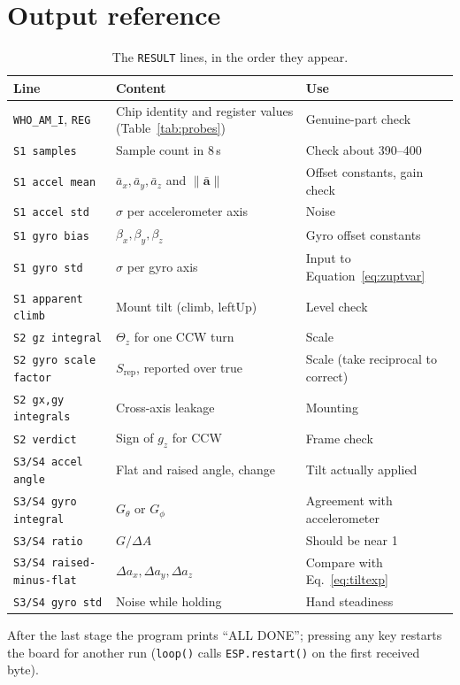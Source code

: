 \documentclass[11pt,a4paper]{report}
\newcommand{\code}[1]{\texttt{#1}}
\begin{document}
\section{Output reference}
\begin{table}[H]
\centering
\caption{The \code{RESULT} lines, in the order they appear.}\label{tab:resultlines}
\small
\begin{tabular}{@{}p{3.4cm}p{6.2cm}p{4.2cm}@{}}
\toprule
Line & Content & Use\\
\midrule
\code{WHO\_AM\_I}, \code{REG} & Chip identity and register values (Table~\ref{tab:probes}) & Genuine-part check\\
\code{S1 samples} & Sample count in 8\,s & Check about 390--400\\
\code{S1 accel mean} & $\bar a_x,\bar a_y,\bar a_z$ and $\lVert\bar{\mathbf a}\rVert$ & Offset constants, gain check\\
\code{S1 accel std} & $\sigma$ per accelerometer axis & Noise\\
\code{S1 gyro bias} & $\beta_x,\beta_y,\beta_z$ & Gyro offset constants\\
\code{S1 gyro std} & $\sigma$ per gyro axis & Input to Equation~\eqref{eq:zuptvar}\\
\code{S1 apparent climb} & Mount tilt (climb, leftUp) & Level check\\
\code{S2 gz integral} & $\Theta_z$ for one CCW turn & Scale\\
\code{S2 gyro scale factor} & $S_{\mathrm{rep}}$, reported over true & Scale (take reciprocal to correct)\\
\code{S2 gx,gy integrals} & Cross-axis leakage & Mounting\\
\code{S2 verdict} & Sign of $g_z$ for CCW & Frame check\\
\code{S3/S4 accel angle} & Flat and raised angle, change & Tilt actually applied\\
\code{S3/S4 gyro integral} & $G_\theta$ or $G_\phi$ & Agreement with accelerometer\\
\code{S3/S4 ratio} & $G/\Delta A$ & Should be near 1\\
\code{S3/S4 raised-minus-flat} & $\Delta a_x,\Delta a_y,\Delta a_z$ & Compare with Eq.~\eqref{eq:tiltexp}\\
\code{S3/S4 gyro std} & Noise while holding & Hand steadiness\\
\bottomrule
\end{tabular}
\end{table}

After the last stage the program prints ``ALL DONE''; pressing any key restarts the board for another run (\code{loop()} calls \code{ESP.restart()} on the first received byte).
\end{document}
